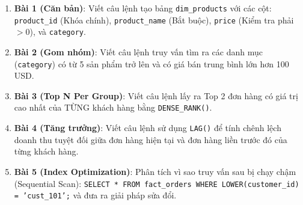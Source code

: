 \begin{baitapbox}
\begin{enumerate}
    \item \textbf{Bài 1 (Căn bản)}: Viết câu lệnh tạo bảng \texttt{dim\_products} với các cột: \texttt{product\_id} (Khóa chính), \texttt{product\_name} (Bắt buộc), \texttt{price} (Kiểm tra phải $> 0$), và \texttt{category}.
    \item \textbf{Bài 2 (Gom nhóm)}: Viết câu lệnh truy vấn tìm ra các danh mục (\texttt{category}) có từ 5 sản phẩm trở lên và có giá bán trung bình lớn hơn 100 USD.
    \item \textbf{Bài 3 (Top N Per Group)}: Viết câu lệnh lấy ra Top 2 đơn hàng có giá trị cao nhất của TỪNG khách hàng bằng \texttt{DENSE\_RANK()}.
    \item \textbf{Bài 4 (Tăng trưởng)}: Viết câu lệnh sử dụng \texttt{LAG()} để tính chênh lệch doanh thu tuyệt đối giữa đơn hàng hiện tại và đơn hàng liền trước đó của từng khách hàng.
    \item \textbf{Bài 5 (Index Optimization)}: Phân tích vì sao truy vấn sau bị chạy chậm (Sequential Scan): \texttt{SELECT * FROM fact\_orders WHERE LOWER(customer\_id) = 'cust\_101';} và đưa ra giải pháp sửa đổi.
\end{enumerate}
\end{baitapbox}


